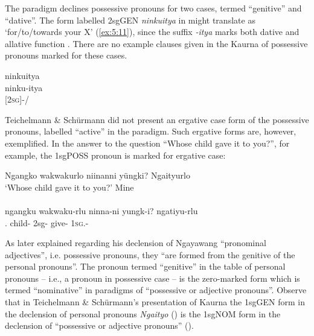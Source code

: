 The paradigm declines possessive pronouns for two cases, termed ``genitive'' and ``dative''. The form labelled 2sgGEN \textit{ninkuitya} in  might translate as `for/to/towards your X' (\ref{ex:5:11}), since the suffix \textit{-itya} marks both dative and allative function \citep[122]{amery_kulurdu_2013}. There are no example clauses given in the Kaurna of possessive pronouns marked for these cases.

\ea\label{ex:5:11}
ninkuitya \\
\gll ninku-itya \\
{}[2\textsc{sg}]-/                         \\
\z

      	  

          
Teichelmann \& Schürmann did not present an ergative case form of the possessive pronouns, labelled “active” in the paradigm. Such ergative forms are, however, exemplified. In the answer to the question “Whose child gave it to you?”, for example, the 1sgPOSS pronoun is marked for ergative case: 

\ea\label{ex:5:12}
Ngangko   		wakwakurlo 	  niinanni   yüngki?	      Ngaityurlo \\
\glt `Whose child gave it to you?'						Mine \\
\citep[12]{teichelmann_outlines_1840} \\
\gll ngangku    		wakwaku-rlu 	 ninna-ni            yungk-i?	       ngatiyu-rlu \\
 .    	  	child-   	 2sg-          give-      1\textsc{sg}.-                                \\
\z

       	

       	
As \citet[14]{moorhouse_vocabulary_1846} later explained regarding his declension of Ngayawang ``pronominal adjectives'', i.e. possessive pronouns, they “are formed from the genitive of the personal pronouns”. The pronoun termed “genitive” in the table of personal pronouns -- i.e., a pronoun in possessive case -- is the zero-marked form which is termed “nominative” in paradigms of ``possessive or adjective pronouns''. Observe that in Teichelmann \& Schürmann’s presentation of Kaurna the 1sgGEN form in the declension of personal pronouns \textit{Ngaityo} () is the 1sgNOM form in the declension of ``possessive or adjective pronouns'' ().

